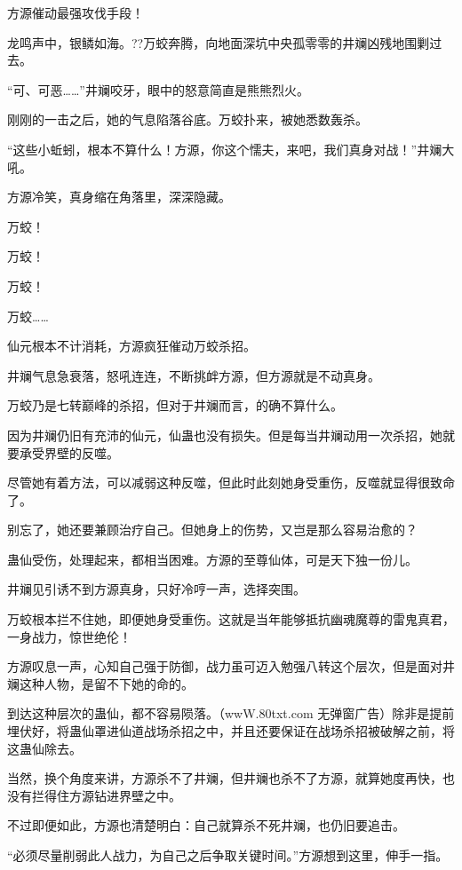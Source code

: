 
\begin{this_body}

方源催动最强攻伐手段！

龙鸣声中，银鳞如海。??万蛟奔腾，向地面深坑中央孤零零的井斓凶残地围剿过去。

“可、可恶……”井斓咬牙，眼中的怒意简直是熊熊烈火。

刚刚的一击之后，她的气息陷落谷底。万蛟扑来，被她悉数轰杀。

“这些小蚯蚓，根本不算什么！方源，你这个懦夫，来吧，我们真身对战！”井斓大吼。

方源冷笑，真身缩在角落里，深深隐藏。

万蛟！

万蛟！

万蛟！

万蛟……

仙元根本不计消耗，方源疯狂催动万蛟杀招。

井斓气息急衰落，怒吼连连，不断挑衅方源，但方源就是不动真身。

万蛟乃是七转巅峰的杀招，但对于井斓而言，的确不算什么。

因为井斓仍旧有充沛的仙元，仙蛊也没有损失。但是每当井斓动用一次杀招，她就要承受界壁的反噬。

尽管她有着方法，可以减弱这种反噬，但此时此刻她身受重伤，反噬就显得很致命了。

别忘了，她还要兼顾治疗自己。但她身上的伤势，又岂是那么容易治愈的？

蛊仙受伤，处理起来，都相当困难。方源的至尊仙体，可是天下独一份儿。

井斓见引诱不到方源真身，只好冷哼一声，选择突围。

万蛟根本拦不住她，即便她身受重伤。这就是当年能够抵抗幽魂魔尊的雷鬼真君，一身战力，惊世绝伦！

方源叹息一声，心知自己强于防御，战力虽可迈入勉强八转这个层次，但是面对井斓这种人物，是留不下她的命的。

到达这种层次的蛊仙，都不容易陨落。（wwW.80txt.com 无弹窗广告）除非是提前埋伏好，将蛊仙罩进仙道战场杀招之中，并且还要保证在战场杀招被破解之前，将这蛊仙除去。

当然，换个角度来讲，方源杀不了井斓，但井斓也杀不了方源，就算她度再快，也没有拦得住方源钻进界壁之中。

不过即便如此，方源也清楚明白：自己就算杀不死井斓，也仍旧要追击。

“必须尽量削弱此人战力，为自己之后争取关键时间。”方源想到这里，伸手一指。


\end{this_body}
